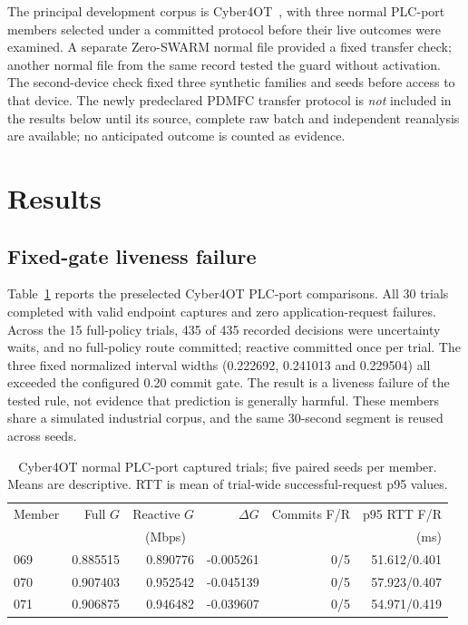 \documentclass[11pt]{article}
\begin{document}
The principal development corpus is Cyber4OT~\cite{cyber4ot2024}, with three normal PLC-port members selected under a committed protocol before their live outcomes were examined. A separate Zero-SWARM normal file provided a fixed transfer check; another normal file from the same record tested the guard without activation. The second-device check fixed three synthetic families and seeds before access to that device. The newly predeclared PDMFC transfer protocol is \emph{not} included in the results below until its source, complete raw batch and independent reanalysis are available; no anticipated outcome is counted as evidence.

\section{Results}
\subsection{Fixed-gate liveness failure}
Table~\ref{tab:plc} reports the preselected Cyber4OT PLC-port comparisons. All 30 trials completed with valid endpoint captures and zero application-request failures. Across the 15 full-policy trials, 435 of 435 recorded decisions were uncertainty waits, and no full-policy route committed; reactive committed once per trial. The three fixed normalized interval widths (0.222692, 0.241013 and 0.229504) all exceeded the configured 0.20 commit gate. The result is a liveness failure of the tested rule, not evidence that prediction is generally harmful. These members share a simulated industrial corpus, and the same 30-second segment is reused across seeds.

\begin{table}[t]
\centering\small
\caption{Cyber4OT normal PLC-port captured trials; five paired seeds per member. Means are descriptive. RTT is mean of trial-wide successful-request p95 values.}
\label{tab:plc}
\begin{tabular}{lrrrrr}
\toprule
Member & Full $G$ & Reactive $G$ & $\Delta G$ & Commits F/R & p95 RTT F/R \\
 & \multicolumn{3}{c}{(Mbps)} & & (ms) \\
\midrule
069 & 0.885515 & 0.890776 & -0.005261 & 0/5 & 51.612/0.401 \\
070 & 0.907403 & 0.952542 & -0.045139 & 0/5 & 57.923/0.407 \\
071 & 0.906875 & 0.946482 & -0.039607 & 0/5 & 54.971/0.419 \\
\bottomrule
\end{tabular}
\end{table}
\end{document}
